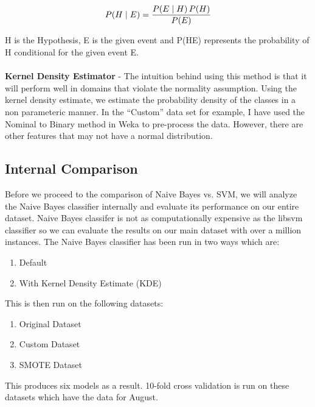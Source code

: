 \documentclass[conference]{IEEEtran}
\begin{document}
$$ P(H \mid E) = \frac{P(E \mid H) \, P(H)}{P(E)} \\$$

H is the Hypothesis, E is the given event and P(H\textbar E) represents the probability of H conditional for the given event E.\\\\\textbf{Kernel Density Estimator} - The intuition behind using this method is that it will perform well in domains that violate the normality assumption\cite{john1995}. Using the kernel density estimate, we estimate the probability density of the classes in a non parameteric manner\cite{perez2009}. In the ``Custom'' data set for example, I have used the Nominal to Binary method in Weka to pre-process the data. However, there are other features that may not have a normal distribution. 


\subsection{Internal Comparison}

Before we proceed to the comparison of Naive Bayes vs. SVM, we will analyze the Naive Bayes classifier internally and evaluate its performance on our entire dataset. Naive Bayes classifer is not as computationally expensive as the libsvm classifier so we can evaluate the results on our main dataset with over a million instances. The Naive Bayes classifier has been run in two ways which are:\\

\begin{enumerate}
\item Default
\item With Kernel Density Estimate (KDE)\\
\end{enumerate}

This is then run on the following datasets:

\begin{enumerate}
\item Original Dataset
\item Custom Dataset
\item SMOTE Dataset
\end{enumerate}

This produces six models as a result. 10-fold cross validation is run on these datasets which have the data for August. \newline 
\end{document}
